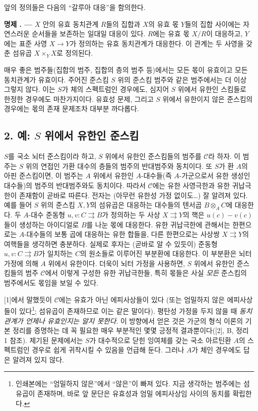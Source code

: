 \documentclass[11pt,twoside,openany]{book}
\numberwithin{equation}{section}
\newcommand{\sourceunit}{front}
\newcommand{\src}[1]{%
  \phantomsection\hypertarget{src:\sourceunit:#1}{}%
  \marginpar{\raggedleft\footnotesize\sffamily #1}%
}
\theoremstyle{plain}
\theoremstyle{definition}
\theoremstyle{remark}
\newcommand{\result}[2]{%
  \par\medskip\noindent\textbf{#1%
  \if\relax\detokenize{#2}\relax\else\space#2\fi. ---}\enspace
}
\begin{document}
앞의 정의들은 다음의 ``갈루아 대응''을 함의한다.

\src{102}
\result{명제}{1.1} $X$ 안의 유효 동치관계 $R$들의 집합과 $X$의 유효
몫 $Y$들의 집합 사이에는 자연스러운 순서들을 보존하는 일대일 대응이
있다. $R$에는 유효 몫 $X/R$이 대응하고, $Y$에는 표준 사영
$X\longrightarrow Y$가 정의하는 유효 동치관계가 대응한다. 이 관계는
두 사영을 갖춘 섬유곱 $X\times_Y X$로 정의된다.

매우 좋은 범주들(집합의 범주, 집합의 층의 범주 등)에서는 모든 몫이
유효이고 모든 동치관계가 유효이다. 주어진 준스킴 $S$ 위의 준스킴
범주와 같은 범주에서는 더 이상 그렇지 않다. 이는 $S$가 체의
스펙트럼인 경우에도, 심지어 $S$ 위에서 유한인 스킴들로 한정한
경우에도 마찬가지이다. 유효성 문제, 그리고 $S$ 위에서 유한이지 않은
준스킴의 경우에는 몫의 존재 문제조차 대부분 까다롭다.

\subsection*{2. 예: $S$ 위에서 유한인 준스킴}

$S$를 국소 뇌터 준스킴이라 하고, $S$ 위에서 유한인 준스킴들의
범주를 $\mathcal C$라 하자. 이 범주는 $S$ 위의 연접인 가환 대수의
층들의 범주의 반대범주와 동치이다. 또 $S$가 환 $A$의 아핀
준스킴이면, 이 범주는 $A$ 위에서 유한인 $A$-대수들(즉 $A$-가군으로서
유한 생성인 대수들)의 범주의 반대범주와도 동치이다. 따라서
$\mathcal C$에는 유한 사영극한과 유한 귀납극한이 존재함이 곧바로
따른다. 전자는 (아무런 유한성 가정 없이도\ldots) 잘 알려져 있다.
예를 들어 $S$ 위의 준스킴 $X,Y$의 섬유곱은 대응하는 대수들의
텐서곱 $B\otimes_A C$에 대응한다. 두 $A$-대수 준동형
$u,v:C\rightrightarrows B$가 정의하는 두 사상
$X\rightrightarrows Y$의 핵은 $u(c)-v(c)$들이 생성하는 아이디얼로
$B$를 나눈 몫에 대응한다. 유한 귀납극한에 관해서는 한편으로는
$A$-대수들의 보통 곱에 대응하는 유한 합들을, 다른 한편으로는
사상쌍 $X\rightrightarrows Y$의 여핵들을 생각하면 충분하다. 실제로
후자는 (곧바로 알 수 있듯이) 준동형
$u,v:C\rightrightarrows B$가 일치하는 $C$의 원소들로 이루어진
부분환에 대응한다. 이 부분환은 뇌터 가정에 의해 $A$ 위에서 유한이다.
더욱이 뇌터 가정을 사용하면, $S$ 위에서 유한인 준스킴들의 범주
$\mathcal C$에서 이렇게 구성한 유한 귀납극한들, 특히 몫들은 사실
\emph{모든} 준스킴의 범주에서도 몫임을 보일 수 있다.

\src{103}
[1]에서 말했듯이 $\mathcal C$에는 유효가 아닌 에피사상들이 있다
(또는 엄밀하지 않은 에피사상들이 있다\footnote{인쇄본에는
``엄밀하지 않은''에서 ``않은''이 빠져 있다. 지금 생각하는 범주에는
섬유곱이 존재하며, 바로 앞 문단은 유효성과 엄밀 에피사상임 사이의
동치를 확립한다.}; 섬유곱이 존재하므로 이는 같은 말이다).
평탄성 가정을 두지 않을 때 \emph{동치관계가 언제나 유효인지는 알지
못한다}. 이 방향에서 얻은 것은 가군의 형식 이론의 기본 정리를
증명하는 데 꼭 필요한 매우 부분적인 몇몇 긍정적 결과뿐이다([2], B,
정리 1 참조). 제기된 문제에서는 $S$가 대수적으로 닫힌 잉여체를 갖는
국소 아르틴환 $A$의 스펙트럼인 경우로 쉽게 귀착시킬 수 있음을
언급해 둔다. 그러나 $A$가 체인 경우에도 답은 알려져 있지 않다.
\end{document}
